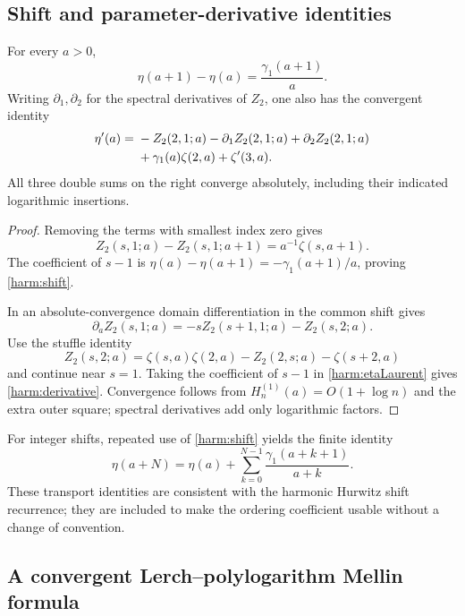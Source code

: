 \subsection{Shift and parameter-derivative identities}

\begin{proposition}
\label{harm:transport}
For every $a>0$,
\begin{equation}\label{harm:shift}
 \boxed{\eta(a+1)-\eta(a)=\frac{\gamma_1(a+1)}a.}
\end{equation}
Writing $\partial_1,\partial_2$ for the spectral derivatives of
$Z_2$, one also has the convergent identity
\begin{align}\label{harm:derivative}
 \eta'(a)={}&-Z_2(2,1;a)-\partial_1Z_2(2,1;a)
                 +\partial_2Z_2(2,1;a)\notag\\
 &+\gamma_1(a)\zeta(2,a)+\zeta'(3,a).
\end{align}
All three double sums on the right converge absolutely, including
their indicated logarithmic insertions.
\end{proposition}

\begin{proof}
Removing the terms with smallest index zero gives
\[
 Z_2(s,1;a)-Z_2(s,1;a+1)=a^{-1}\zeta(s,a+1).
\]
The coefficient of $s-1$ is
$\eta(a)-\eta(a+1)=-\gamma_1(a+1)/a$, proving
\eqref{harm:shift}.

In an absolute-convergence domain differentiation in the common
shift gives
\[
 \partial_a Z_2(s,1;a)=-sZ_2(s+1,1;a)-Z_2(s,2;a).
\]
Use the stuffle identity
\[
 Z_2(s,2;a)=\zeta(s,a)\zeta(2,a)-Z_2(2,s;a)-\zeta(s+2,a)
\]
and continue near $s=1$. Taking the coefficient of $s-1$ in
\eqref{harm:etaLaurent} gives \eqref{harm:derivative}.
Convergence follows from $H_n^{(1)}(a)=O(1+\log n)$ and the extra
outer square; spectral derivatives add only logarithmic factors.
\end{proof}

For integer shifts, repeated use of \eqref{harm:shift} yields the
finite identity
\[
 \eta(a+N)=\eta(a)+\sum_{k=0}^{N-1}
                         \frac{\gamma_1(a+k+1)}{a+k}.
\]
These transport identities are consistent with the harmonic Hurwitz
shift recurrence; they are included to make the ordering coefficient
usable without a change of convention.

\subsection{A convergent Lerch--polylogarithm Mellin formula}

